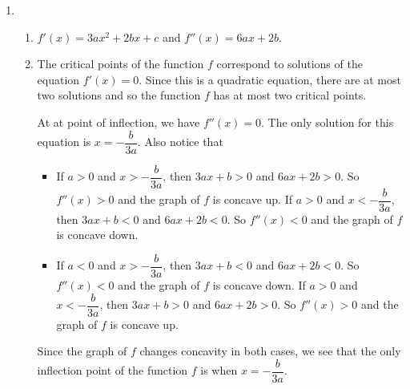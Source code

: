 \begin{enumerate}
\item \begin{enumerate}
\item $f ' (x) = 3ax^2 + 2bx + c$ and $f '' (x) = 6ax + 2b$.

\item The critical points of the function $f$ correspond to solutions of the equation $f'(x) = 0$.  Since this is a quadratic equation, there are at most two solutions and so the function $f$ has at most two critical points.

\noindent
At at point of inflection, we have $f ''(x) = 0$.  The only solution for this equation is $x =  - \dfrac{b}{3a}$.  Also notice that
\begin{itemize}
\item If $a > 0$ and $x >  - \dfrac{b}{3a}$, then $3ax + b > 0$ and $6ax + 2b > 0$.  So $f''(x) > 0$ and the graph of $f$ is concave up.  If $a > 0$ and $x <  - \dfrac{b}{3a}$, then $3ax + b < 0$ and $6ax + 2b < 0$.  So $f''(x) < 0$ and the graph of $f$ is concave down.

\item If $a < 0$ and $x >  - \dfrac{b}{3a}$, then $3ax + b < 0$ and $6ax + 2b < 0$.  So $f''(x) < 0$ and the graph of $f$ is concave down.  If $a > 0$ and $x <  - \dfrac{b}{3a}$, then $3ax + b > 0$ and $6ax + 2b > 0$.  So $f''(x) > 0$ and the graph of $f$ is concave up.
\end{itemize}
Since the graph of $f$ changes concavity in both cases, we see that the only inflection point of the function $f$ is when $x =  - \dfrac{b}{3a}$.
\end{enumerate}
\end{enumerate}





